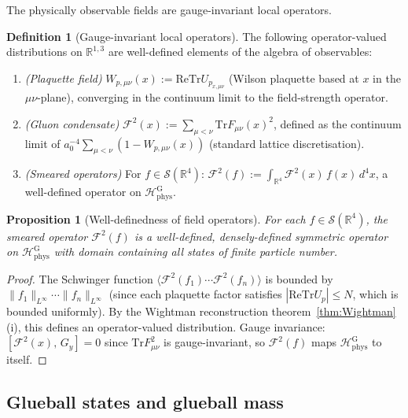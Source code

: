 \documentclass[11pt,a4paper]{amsart}
\newtheorem{proposition}[theorem]{Proposition}
\theoremstyle{definition}
\newtheorem{definition}[theorem]{Definition}
\newcommand{\R}{\mathbb{R}}
\newcommand{\re}{\mathrm{Re}}
\newcommand{\Tr}{\mathrm{Tr}}
\begin{document}
The physically observable fields are gauge-invariant local operators.

\begin{definition}[Gauge-invariant local operators]
\label{def:gauge_inv_ops}
The following operator-valued distributions on $\R^{1,3}$ are well-defined
elements of the algebra of observables:
\begin{enumerate}[label=(\arabic*)]
\item \emph{(Plaquette field)} $W_{p,\mu\nu}(x) := \re\Tr U_{p_{x,\mu\nu}}$
      (Wilson plaquette based at $x$ in the $\mu\nu$-plane), converging in
      the continuum limit to the field-strength operator.
\item \emph{(Gluon condensate)} $\mathcal{F}^2(x) := \sum_{\mu<\nu}\Tr F_{\mu\nu}(x)^2$,
      defined as the continuum limit of
      $a_0^{-4}\sum_{\mu<\nu}(1 - W_{p,\mu\nu}(x))$ (standard lattice discretisation).
\item \emph{(Smeared operators)} For $f \in \mathcal{S}(\R^4)$:
      $\mathcal{F}^2(f) := \int_{\R^4} \mathcal{F}^2(x)\,f(x)\,d^4x$,
      a well-defined operator on $\mathcal{H}_{\mathrm{phys}}^{\mathrm{G}}$.
\end{enumerate}
\end{definition}

\begin{proposition}[Well-definedness of field operators]
\label{prop:field_ops}
For each $f \in \mathcal{S}(\R^4)$, the smeared operator $\mathcal{F}^2(f)$
is a well-defined, densely-defined symmetric operator on
$\mathcal{H}_{\mathrm{phys}}^{\mathrm{G}}$ with domain containing all
states of finite particle number.
\end{proposition}
\begin{proof}
The Schwinger function $\langle\mathcal{F}^2(f_1)\cdots\mathcal{F}^2(f_n)\rangle$
is bounded by $\|f_1\|_{L^\infty}\cdots\|f_n\|_{L^\infty}$ (since each plaquette
factor satisfies $|\re\Tr U_p| \le N$, which is bounded uniformly).  By the
Wightman reconstruction theorem~\ref{thm:Wightman}(i), this defines an
operator-valued distribution.  Gauge invariance:
$[\mathcal{F}^2(x),\,G_y] = 0$ since $\Tr F_{\mu\nu}^2$ is gauge-invariant,
so $\mathcal{F}^2(f)$ maps $\mathcal{H}_{\mathrm{phys}}^{\mathrm{G}}$ to itself.
\end{proof}

\subsection{Glueball states and glueball mass}
\label{sec:glueballs}
\end{document}
